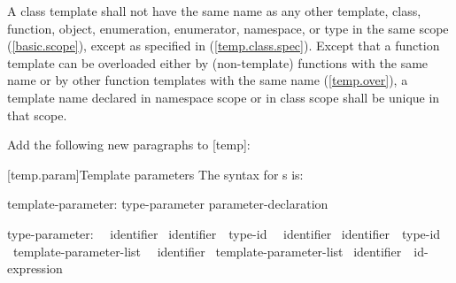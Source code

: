 \documentclass[american]{book}
\newcommand{\editorial}[1]{\colorbox{editbackground}{\begin{minipage}{\linewidth
}#1\end{minipage}}}
\begin{document}
\begin{paras}
\setcounter{Paras}{4}
\pnum
A class template shall not have the same name as any other
template, class,  function, object, enumeration, enumerator, namespace, or
type in the same scope (\ref{basic.scope}), except as specified in (\ref{temp.class.spec}).
Except that a function template can be overloaded either by (non-template)
functions with the same name or by other function templates
with the same name (\ref{temp.over}),
a template name declared in namespace scope or in class scope shall be unique
in that scope.

\noindent\editorial{Add the following new paragraphs to [temp]:}
\setcounter{Paras}{11}
\pnum
{}

[temp.param]{Template parameters}
\pnum
The syntax for
s
is:

\begin{bnf}
%
template-parameter:\br
  type-parameter\br
  parameter-declaration
\end{bnf}

\begin{bnf}
%
type-parameter:\br
  \ \opt\ identifier\opt\br
  \ identifier\opt\ \terminal{=}\ type-id\br
  \ \opt\ identifier\opt\br
  \ identifier\opt\ \terminal{=}\ type-id\br
  \ template-parameter-list \ \opt\ identifier\opt\br
  \ template-parameter-list \ identifier\opt\ \terminal{=}\ id-expression\br
  \br
  \br
     \br
    \addedConcepts{\mbox{\terminal{>}}}  \br


\end{bnf}
\end{paras}
\end{document}
